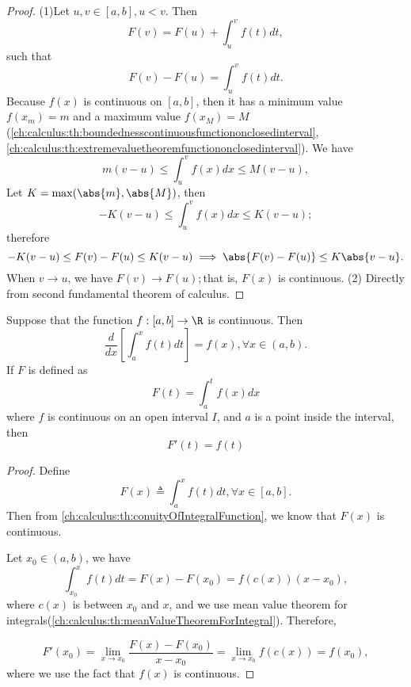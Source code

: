 \begin{refsection}
\begin{lemma}
\end{lemma}
\begin{proof}
(1)Let $u,v\in [a,b], u<v$. Then
$$F(v) = F(u) + \int_u^v f(t) dt,$$
such that
$$F(v)-F(u) = \int_u^v f(t)dt.$$
Because $f(x)$ is continuous on $[a,b]$, then it has a minimum value $f(x_m) = m$ and a maximum value $f(x_M) = M$(\autoref{ch:calculus:th:boundednesscontinuousfunctiononclosedinterval},\autoref{ch:calculus:th:extremevaluetheoremfunctiononclosedinterval}). We have
$$m(v-u) \leq \int_u^v f(x) dx  \leq M(v-u),$$
Let $K = \max(\abs{m},\abs{M})$, then
$$-K(v-u) \leq \int_u^v f(x) dx  \leq K(v-u);$$
therefore
$$-K(v-u) \leq F(v) - F(u)  \leq K(v-u) \implies \abs{F(v)-F(u)}\leq K\abs{v-u}.$$
When $v\to u$, we have $F(v)\to F(u);$that is, $F(x)$ is continuous.
(2) Directly from second fundamental theorem of calculus.
\end{proof}


\begin{theorem}\cite[168]{fitzpatrick2006advanced}\label{ch:calculus:th:SecondFundamentalTheoremOfCalculus}
Suppose that the function $f:[a,b]\to \R$ is continuous. Then
$$\frac{d}{dx}[\int_a^x f(t)dt] = f(x), \forall x\in (a,b).$$	
	If $F$ is defined as
	$$F(t) = \int_a^t f(x)dx$$
	where $f$ is continuous on an open interval $I$, and $a$ is a point inside the interval, 
	then
	$$F'(t) = f(t)$$
\end{theorem}
\begin{proof}
Define
$$F(x) \triangleq \int_a^x f(t)dt, \forall x\in [a,b].$$
Then from \autoref{ch:calculus:th:conuityOfIntegralFunction}, we know that $F(x)$ is continuous. 

Let $x_0\in (a,b)$, we have
$$\int_{x_0}^x f(t)dt = F(x) - F(x_0) = f(c(x))(x-x_0),$$
where $c(x)$ is between $x_0$ and $x$, and we use mean value theorem for integrals(\autoref{ch:calculus:th:meanValueTheoremForIntegral}).
Therefore,

$$F'(x_0) = \lim_{x\to x_0}\frac{F(x)-F(x_0)}{x - x_0} = \lim_{x\to x_0} f(c(x)) = f(x_0),$$
where we use the fact that $f(x)$ is continuous.
\end{proof}


\end{refsection}
